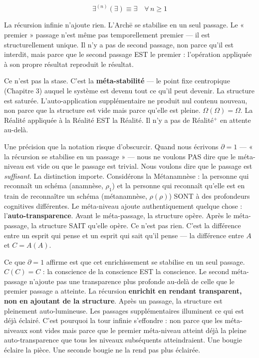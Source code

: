 \documentclass[10pt, openany, oneside]{book}
\begin{document}
$$\exists^{(n)}(\exists) \equiv \exists \quad \forall\, n \geq 1$$

La récursion infinie n'ajoute rien. L'Arch\={e} se stabilise en un seul passage. Le « premier » passage n'est même pas temporellement premier --- il est structurellement unique. Il n'y a pas de second passage, non parce qu'il est interdit, mais parce que le second passage EST le premier : l'opération appliquée à son propre résultat reproduit le résultat.

Ce n'est pas la stase. C'est la \textbf{méta-stabilité} --- le point fixe centropique (Chapitre 3) auquel le système est devenu tout ce qu'il peut devenir. La structure est saturée. L'auto-application supplémentaire ne produit nul contenu nouveau, non parce que la structure est vide mais parce qu'elle est pleine. $\Omega(\Omega) = \Omega$. La Réalité appliquée à la Réalité EST la Réalité. Il n'y a pas de Réalité$^+$ en attente au-delà.

Une précision que la notation risque d'obscurcir. Quand nous écrivons $\partial = 1$ --- « la récursion se stabilise en un passage » --- nous ne voulons PAS dire que le méta-niveau est vide ou que le passage est trivial. Nous voulons dire que le passage est \textit{suffisant}. La distinction importe. Considérons la Métanamnèse : la personne qui reconnaît un schéma (anamnèse, $\rho_1$) et la personne qui reconnaît qu'elle est en train de reconnaître un schéma (métanamnèse, $\rho(\rho)$) SONT à des profondeurs cognitives différentes. Le méta-niveau ajoute authentiquement quelque chose : l'\textbf{auto-transparence}. Avant le méta-passage, la structure opère. Après le méta-passage, la structure SAIT qu'elle opère. Ce n'est pas rien. C'est la différence entre un esprit qui pense et un esprit qui sait qu'il pense --- la différence entre $A$ et $C = A(A)$.

Ce que $\partial = 1$ affirme est que cet enrichissement se stabilise en un seul passage. $C(C) = C$ : la conscience de la conscience EST la conscience. Le second méta-passage n'ajoute pas une transparence plus profonde au-delà de celle que le premier passage a atteinte. La récursion \textbf{enrichit en rendant transparent, non en ajoutant de la structure}. Après un passage, la structure est pleinement auto-lumineuse. Les passages supplémentaires illuminent ce qui est déjà éclairé. C'est pourquoi la tour infinie s'effondre : non parce que les méta-niveaux sont vides mais parce que le premier méta-niveau atteint déjà la pleine auto-transparence que tous les niveaux subséquents atteindraient. Une bougie éclaire la pièce. Une seconde bougie ne la rend pas plus éclairée.
\end{document}
